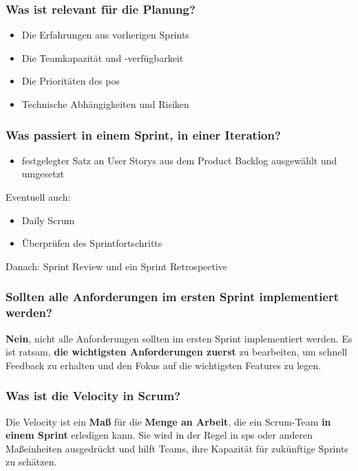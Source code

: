 \documentclass[main.tex]{subfiles}
\begin{document}
\subsubsection*{Was ist relevant für die Planung?} %
\begin{itemize}
    \item Die Erfahrungen aus vorherigen \glspl{Sprint}
    \item Die Teamkapazität und -verfügbarkeit
    \item Die Prioritäten des \gls{po}s
    \item Technische Abhängigkeiten und Risiken
\end{itemize}

\subsubsection*{Was passiert in einem \gls{Sprint}, in einer Iteration?} %
\begin{itemize}
    \item festgelegter Satz an \glspl{User Story} aus dem \gls{Product Backlog} ausgewählt und umgesetzt
\end{itemize}
Eventuell auch: 
\begin{itemize}
    \item \gls{Daily Scrum}
    \item Überprüfen des \gls{Sprint}fortschritts
\end{itemize}
Danach: \gls{Sprint Review} und ein \gls{Sprint Retrospective}

\subsubsection*{Sollten alle Anforderungen im ersten \gls{Sprint} implementiert werden?} %
\textbf{Nein}, nicht alle Anforderungen sollten im ersten \gls{Sprint} implementiert werden. Es ist ratsam, \textbf{die wichtigsten Anforderungen zuerst} zu bearbeiten, um schnell Feedback zu erhalten und den Fokus auf die wichtigsten Features zu legen.

\subsubsection*{Was ist die \gls{Velocity} in Scrum?} %
Die \gls{Velocity} ist ein \textbf{Maß} für die \textbf{Menge an Arbeit}, die ein Scrum-Team \textbf{in einem \gls{Sprint}} erledigen kann. Sie wird in der Regel in \glspl{sp} oder anderen Maßeinheiten ausgedrückt und hilft Teams, ihre Kapazität für zukünftige \glspl{Sprint} zu schätzen.
\end{document}
